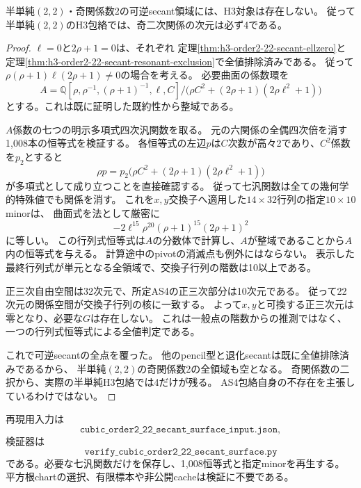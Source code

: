\begin{theorem}[可逆secant必要曲面の全値排除]
\label{thm:h3-order2-22-secant-surface-empty}
半単純$(2,2)$・奇関係数2の可逆secant領域には、H3対象は存在しない。
従って半単純$(2,2)$のH3包絡では、奇二次関係の次元は必ず4である。
\end{theorem}
\begin{proof}
$\ell=0$と$2\rho+1=0$は、それぞれ
定理\ref{thm:h3-order2-22-secant-ellzero}と
定理\ref{thm:h3-order2-22-secant-resonant-exclusion}で全値排除済みである。
従って$\rho(\rho+1)\ell(2\rho+1)\ne0$の場合を考える。
必要曲面の係数環を
\[
 A=\mathbb Q[\rho,\rho^{-1},(\rho+1)^{-1},\ell,C]/
 \bigl(\rho C^2+(2\rho+1)(2\rho\ell^2+1)\bigr)
\]
とする。これは既に証明した既約性から整域である。

$A$係数の七つの明示多項式四次汎関数を取る。
元の六関係の全偶四次倍を消す1,008本の恒等式を検証する。
各恒等式の左辺$p$は$C$次数が高々2であり、$C^2$係数を$p_2$とすると
\[
 \rho p=p_2\bigl(\rho C^2+(2\rho+1)(2\rho\ell^2+1)\bigr)
\]
が多項式として成り立つことを直接確認する。
従って七汎関数は全ての幾何学的特殊値でも関係を消す。
これを$x,y$交換子へ適用した$14\times32$行列の指定$10\times10$ minorは、
曲面式を法として厳密に
\[
 -2\ell^{15}\rho^{20}(\rho+1)^{15}(2\rho+1)^2
\]
に等しい。
この行列式恒等式は$A$の分数体で計算し、$A$が整域であることから$A$内の恒等式を与える。
計算途中のpivotの消滅点も例外にはならない。
表示した最終行列式が単元となる全領域で、交換子行列の階数は10以上である。

正三次自由空間は32次元で、所定AS4の正三次部分は10次元である。
従って22次元の関係空間が交換子行列の核に一致する。
よって$x,y$と可換する正三次元は零となり、必要な$G$は存在しない。
これは一般点の階数からの推測ではなく、一つの行列式恒等式による全値判定である。

これで可逆secantの全点を覆った。
他のpencil型と退化secantは既に全値排除済みであるから、
半単純$(2,2)$の奇関係数2の全領域も空となる。
奇関係数の二択から、実際の半単純H3包絡では4だけが残る。
AS4包絡自身の不存在を主張しているわけではない。
\end{proof}

再現用入力は
\[
 \texttt{cubic\_order2\_22\_secant\_surface\_input.json},
\]
検証器は
\[
 \texttt{verify\_cubic\_order2\_22\_secant\_surface.py}
\]
である。必要な七汎関数だけを保存し、1,008恒等式と指定minorを再生する。
平方根chartの選択、有限標本や非公開cacheは検証に不要である。
